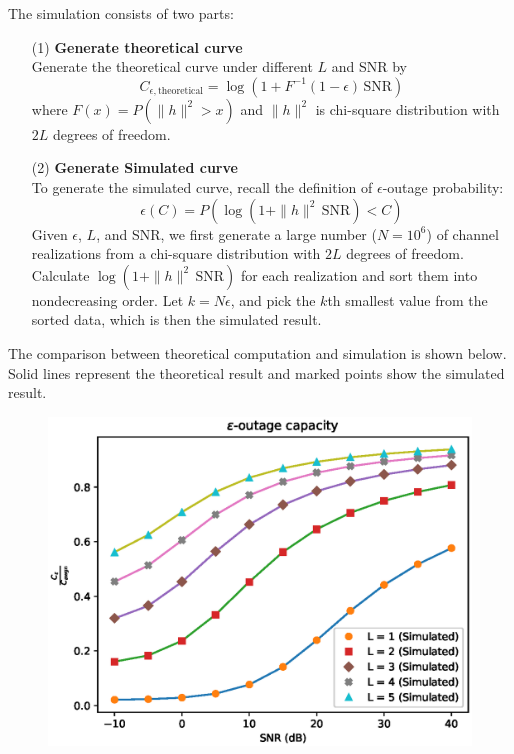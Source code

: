 The simulation consists of two parts:
\vspace{-5pt}
\begin{itemize}
	\item[(1)] \textbf{Generate theoretical curve \hfill \\}
	Generate the theoretical curve under different $L$ and SNR by
	\begin{equation*}
		C_{\epsilon, \text{theoretical}} = \log\left(1 + F^{-1}(1-\epsilon) \, \text{SNR}\right)
	\end{equation*}
	where $F(x) = P\left(\|h\|^{2} > x\right)$ and $\|h\|^{2}$ is chi-square distribution with $2L$ degrees of freedom.
	\item[(2)] \textbf{Generate Simulated curve \hfill \\}
	To generate the simulated curve, recall the definition of $\epsilon$-outage probability:
	\begin{equation*}
		\epsilon\left(C\right) = P\left(\log(1 + \|h\|^{2} \, \text{SNR}) < C\right)
	\end{equation*} 
	Given $\epsilon$, $L$, and SNR, we first generate a large number ($N = 10^6$) of channel 
	realizations from a chi-square distribution with $2L$ degrees of freedom. Calculate 
	$\log(1 + \|h\|^{2} \, \text{SNR})$ for each realization and sort them into nondecreasing 
	order. Let $k = N\epsilon$, and pick the $k$th smallest value from the sorted data, which
	 is then the simulated result.

\end{itemize}

The comparison between theoretical computation and simulation is shown below. Solid lines 
represent the theoretical result and marked points show the simulated result. 
\begin{figure}[H]
	\centering
	\includegraphics[scale = 0.85]{epsilon_outage.eps}
\end{figure}